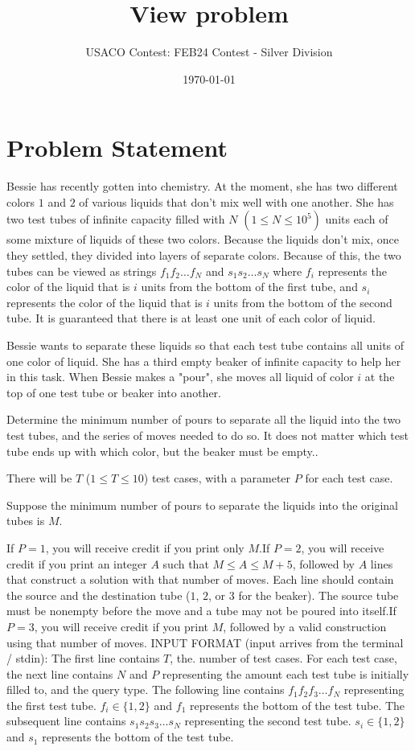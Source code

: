 \documentclass[12pt]{article}
\title{View problem}
\author{USACO Contest: FEB24 Contest - Silver Division}
\date{\today}
\begin{document}
\maketitle

\section*{Problem Statement}


Bessie has recently gotten into chemistry. At the moment, she has two different
colors $1$ and $2$ of various liquids that don't mix well with one another. She
has two test tubes of infinite capacity filled with $N$ $(1 \leq N \leq 10^5)$
units each of some mixture of liquids of these two colors. Because the liquids
don’t mix,  once they settled, they divided into layers of separate colors.
Because of this, the two tubes can be viewed as strings $f_1f_2\ldots f_N$ and
$s_1s_2\ldots s_N$  where $f_i$ represents the color of the liquid that is $i$
units from the bottom of the first tube, and $s_i$ represents the color of the
liquid that is $i$ units from the bottom of the second tube. It is guaranteed
that there is at least one unit of each color of liquid.

Bessie wants to separate these liquids so that each test tube contains all units
of one color of liquid. She has a third empty beaker of infinite capacity to
help her in this task. When Bessie makes a "pour", she moves all liquid of color
$i$ at the top of one test tube or beaker into another.

Determine the minimum number of pours to separate all the liquid into the two
test tubes, and the series of moves needed to do so. It does not matter which
test tube ends up with which color, but the beaker must be empty..

There will be $T$ ($1 \leq T \leq 10$) test cases, with a parameter $P$ for each
test case.

Suppose the minimum number of pours to separate the liquids into the original
tubes is $M$.

If $P=1$, you will receive credit if you print only $M$.If $P=2$, you will receive credit if you print an integer $A$ such that
$M \leq A \leq M+5$, followed by $A$ lines that construct a solution with that
number of moves. Each line should contain the source and the destination tube
($1$, $2$, or $3$ for the beaker). The source tube must be nonempty before the
move and a tube may not be poured into itself.If $P=3$, you will receive credit if you print $M$, followed by a valid
construction using that number of moves.
INPUT FORMAT (input arrives from the terminal / stdin):
The first line contains $T$, the. number of test cases. For each test case, the
next line contains $N$ and $P$ representing the amount each test tube is
initially filled to, and the query type. The following line contains
$f_1f_2f_3\ldots f_N$ representing  the first test tube. $f_i \in \{ 1,2 \}$ and
$f_1$ represents the bottom of the test tube. The subsequent line contains
$s_1s_2s_3\ldots s_N$ representing the second test tube. $s_i \in \{ 1,2 \}$ and
$s_1$ represents the bottom of the test tube.
\end{document}
